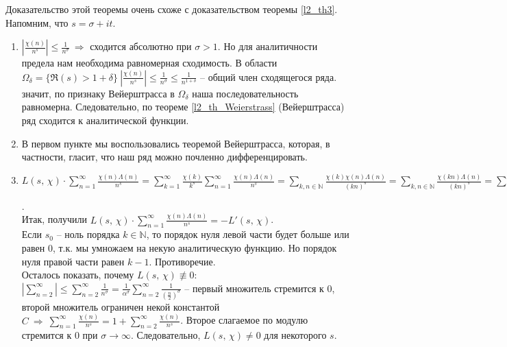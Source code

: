 \begin{pf}
	Доказательство этой теоремы очень схоже с доказательством теоремы \ref{l2_th3}. Напомним, что $s = \sigma + it$.
	\begin{enumerate}[nolistsep]
		\item[1)] $\displaystyle \left| \frac{\chi(n)}{n^s} \right| \leq \frac{1}{n^\sigma} \ \Rightarrow$ сходится абсолютно при $\sigma > 1$. Но для аналитичности предела нам необходима равномерная сходимость. В области $\displaystyle \Omega_\delta = \{ \Re(s) > 1+\delta \} \ \left| \frac{\chi(n)}{n^s} \right| \leq \frac{1}{n^\sigma} \leq \frac{1}{n^{1+\delta}}$ -- общий член сходящегося ряда. значит, по признаку Вейерштрасса в $\Omega_\delta$ наша последовательность равномерна. Следовательно, по теореме \ref{l2_th_Weierstrass} (Вейерштрасса) ряд сходится к аналитической функции.
		\item[2)] В первом пункте мы воспользовались теоремой Вейерштрасса, которая, в частности, гласит, что наш ряд можно почленно дифференцировать.
		\item[3)] $\displaystyle L(s,\,\chi)\cdot\sum\limits_{n=1}^\infty \frac{\chi(n)\Lambda(n)}{n^s} = \sum\limits_{k=1}^\infty \frac{\chi(k)}{k^s} \sum\limits_{n=1}^\infty \frac{\chi(n)\Lambda(n)}{n^s} = \sum\limits_{k,n \in \mathbb{N}} \frac{\chi(k)\chi(n)\Lambda(n)}{(kn)^s} = \sum\limits_{k,n \in \mathbb{N}} \frac{\chi(kn)\Lambda(n)}{(kn)^s} = \sum\limits_{\substack{n \in \mathbb{N} \\ d \vert n}} \frac{\chi(n)\Lambda(d)}{n^s} = \sum\limits_{n \in \mathbb{N}} \frac{\chi(n) \ln(n)}{n^s} = -L'(s,\,\chi)$.\\
			Итак, получили $\displaystyle L(s,\,\chi) \cdot \sum\limits_{n=1}^\infty \frac{\chi(n)\Lambda(n)}{n^s} = -L'(s,\,\chi)$.\\
			Если $s_0$ -- ноль порядка $k \in \mathbb{N}$, то порядок нуля левой части будет больше или равен $0$, т.к. мы умножаем на некую аналитическую функцию. Но порядок нуля правой части равен $k-1$. Противоречие.\\
Осталось показать, почему $L(s, \, \chi) \not\equiv 0$: $\displaystyle \left| \sum\limits_{n=2}^\infty \right| \leq \sum\limits_{n=2}^\infty \frac{1}{n^\sigma} = \frac{1}{\alpha^\sigma}\sum\limits_{n=2}^\infty \frac{1}{\left( \frac{n}{2}\right)^\sigma}$ -- первый множитель стремится к $0$, второй множитель ограничен некой константой $\displaystyle C \ \Rightarrow \ \sum\limits_{n=1}^\infty \frac{\chi(n)}{n^s} = 1+\sum\limits_{n=2}^\infty \frac{\chi(n)}{n^s}$. Второе слагаемое по модулю стремится к $0$ при $\sigma \to \infty$. Следовательно, $L(s, \, \chi) \ne 0$ для некоторого $s$.
	\end{enumerate}
\end{pf}
